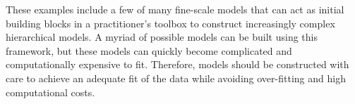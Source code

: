 These examples include a few of many fine-scale models that can act as initial building blocks in a practitioner's toolbox to construct increasingly complex hierarchical models. 
A myriad of possible models can be built using this framework, but these models can quickly become complicated and computationally expensive to fit. Therefore, models should be constructed with care to achieve an adequate fit of the data while avoiding over-fitting and high computational costs.

